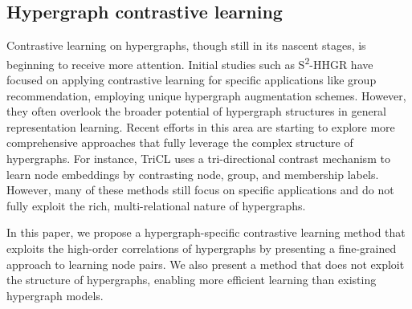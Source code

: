 \subsection{Hypergraph contrastive learning}
Contrastive learning on hypergraphs, though still in its nascent stages, is beginning to receive more attention. Initial studies such as S\textsuperscript{2}-HHGR\cite{zhang2021double} have focused on applying contrastive learning for specific applications like group recommendation, employing unique hypergraph augmentation schemes. However, they often overlook the broader potential of hypergraph structures in general representation learning. Recent efforts in this area are starting to explore more comprehensive approaches that fully leverage the complex structure of hypergraphs. For instance, TriCL\cite{lee2023m} uses a tri-directional contrast mechanism to learn node embeddings by contrasting node, group, and membership labels. However, many of these methods still focus on specific applications and do not fully exploit the rich, multi-relational nature of hypergraphs.

In this paper, we propose a hypergraph-specific contrastive learning method that exploits the high-order correlations of hypergraphs by presenting a fine-grained approach to learning node pairs. We also present a method that does not exploit the structure of hypergraphs, enabling more efficient learning than existing hypergraph models.